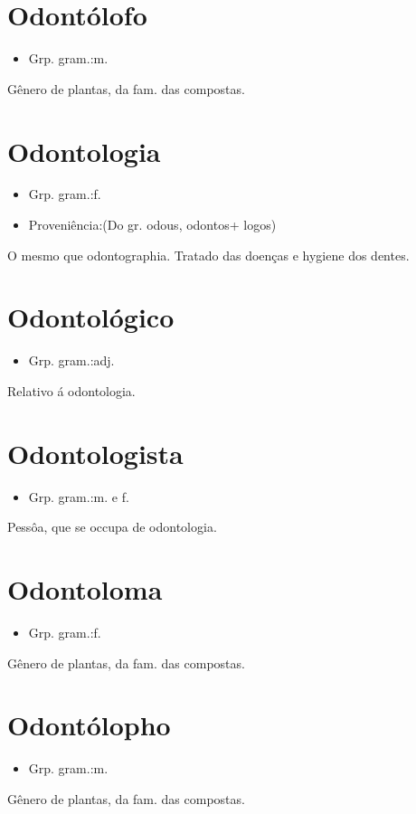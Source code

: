 \section{Odontólofo}
\begin{itemize}
\item {Grp. gram.:m.}
\end{itemize}
Gênero de plantas, da fam. das compostas.
\section{Odontologia}
\begin{itemize}
\item {Grp. gram.:f.}
\end{itemize}
\begin{itemize}
\item {Proveniência:(Do gr. \textunderscore odous\textunderscore , \textunderscore odontos\textunderscore  + \textunderscore logos\textunderscore )}
\end{itemize}
O mesmo que \textunderscore odontographia\textunderscore .
Tratado das doenças e hygiene dos dentes.
\section{Odontológico}
\begin{itemize}
\item {Grp. gram.:adj.}
\end{itemize}
Relativo á odontologia.
\section{Odontologista}
\begin{itemize}
\item {Grp. gram.:m.  e  f.}
\end{itemize}
Pessôa, que se occupa de odontologia.
\section{Odontoloma}
\begin{itemize}
\item {Grp. gram.:f.}
\end{itemize}
Gênero de plantas, da fam. das compostas.
\section{Odontólopho}
\begin{itemize}
\item {Grp. gram.:m.}
\end{itemize}
Gênero de plantas, da fam. das compostas.
